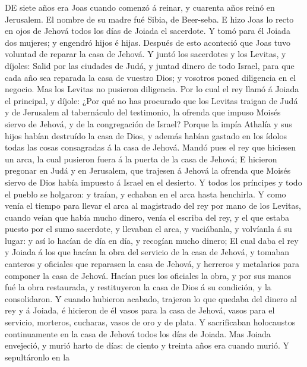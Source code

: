  DE siete años era Joas cuando comenzó á reinar, y
cuarenta años reinó en Jerusalem. El nombre de su madre fué Sibia, de
Beer-seba.  E hizo Joas lo recto en ojos de Jehová todos
los días de Joiada el sacerdote.  Y tomó para él Joiada
dos mujeres; y engendró hijos é hijas.  Después de esto
aconteció que Joas tuvo voluntad de reparar la casa de Jehová.
 Y juntó los sacerdotes y los Levitas, y díjoles: Salid
por las ciudades de Judá, y juntad dinero de todo Israel, para que cada
año sea reparada la casa de vuestro Dios; y vosotros poned diligencia en
el negocio. Mas los Levitas no pusieron diligencia.  Por
lo cual el rey llamó á Joiada el principal, y díjole: ¿Por qué no has
procurado que los Levitas traigan de Judá y de Jerusalem al tabernáculo
del testimonio, la ofrenda que impuso Moisés siervo de Jehová, y de la
congregación de Israel?  Porque la impía Athalía y sus
hijos habían destruído la casa de Dios, y además habían gastado en los
ídolos todas las cosas consagradas á la casa de Jehová. 
Mandó pues el rey que hiciesen un arca, la cual pusieron fuera á la
puerta de la casa de Jehová;  E hicieron pregonar en Judá
y en Jerusalem, que trajesen á Jehová la ofrenda que Moisés siervo de
Dios había impuesto á Israel en el desierto.  Y todos los
príncipes y todo el pueblo se holgaron: y traían, y echaban en el arca
hasta henchirla.  Y como venía el tiempo para llevar el
arca al magistrado del rey por mano de los Levitas, cuando veían que
había mucho dinero, venía el escriba del rey, y el que estaba puesto por
el sumo sacerdote, y llevaban el arca, y vaciábanla, y volvíanla á su
lugar: y así lo hacían de día en día, y recogían mucho dinero;
 El cual daba el rey y Joiada á los que hacían la obra
del servicio de la casa de Jehová, y tomaban canteros y oficiales que
reparasen la casa de Jehová, y herreros y metalarios para componer la
casa de Jehová.  Hacían pues los oficiales la obra, y por
sus manos fué la obra restaurada, y restituyeron la casa de Dios á su
condición, y la consolidaron.  Y cuando hubieron acabado,
trajeron lo que quedaba del dinero al rey y á Joiada, é hicieron de él
vasos para la casa de Jehová, vasos para el servicio, morteros,
cucharas, vasos de oro y de plata. Y sacrificaban holocaustos
continuamente en la casa de Jehová todos los días de Joiada.
 Mas Joiada envejeció, y murió harto de días: de ciento y
treinta años era cuando murió.  Y sepultáronlo en la
